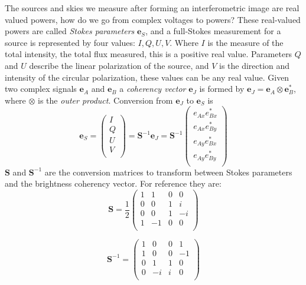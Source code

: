 \documentclass[usenatbib,usegraphicx]{article}
\begin{document}
The sources and skies we measure after forming an interferometric image are real valued powers, how do we go from complex voltages to powers?
These real-valued powers are called \emph{Stokes parameters} $\mathbf{e}_S$, and a full-Stokes measurement for a source is represented by four values: $I,Q,U,V$.
Where $I$ is the measure of the total intensity, the total flux measured, this is a positive real value.
Parameters $Q$ and $U$ describe the linear polarization of the source, and $V$ is the direction and intensity of the circular polarization, these values can be any real value.
Given two complex signals $\mathbf{e}_A$ and $\mathbf{e}_B$ a \emph{coherency vector} $\mathbf{e}_J$ is formed by $\mathbf{e}_J = \mathbf{e}_A \otimes \mathbf{e}_B^*$, where $\otimes$ is the \emph{outer product}.
Conversion from $\mathbf{e}_J$ to $\mathbf{e}_S$ is
%
\begin{equation}
\label{eq:complex2stokes}
\mathbf{e}_S =
    \begin{pmatrix}
    I \\
    Q \\
    U \\
    V \\
    \end{pmatrix}
=\mathbf{S}^{-1} \mathbf{e}_J = \mathbf{S}^{-1}
    \begin{pmatrix}
    e_{Ax} e_{Bx}^* \\
    e_{Ax} e_{By}^* \\
    e_{Ay} e_{Bx}^* \\
    e_{Ay} e_{By}^* \\
    \end{pmatrix}
\end{equation}
%
$\mathbf{S}$ and $\mathbf{S}^{-1}$ are the conversion matrices to transform between Stokes parameters and the brightness coherency vector.
For reference they are:
%
\begin{equation}
\label{eq:s_transform}
\mathbf{S} = \frac{1}{2}
    \begin{pmatrix}
    1 & 1 & 0 & 0 \\
    0 & 0 & 1 & i \\
    0 & 0 & 1 & -i \\
    1 & -1 & 0 & 0 \\
    \end{pmatrix}
\end{equation}

\begin{equation}
\label{eq:s_inv_transform}
\mathbf{S}^{-1} =
    \begin{pmatrix}
    1 & 0 & 0 & 1 \\
    1 & 0 & 0 & -1 \\
    0 & 1 & 1 & 0 \\
    0 & -i & i & 0 \\
    \end{pmatrix}
\end{equation}
\end{document}
